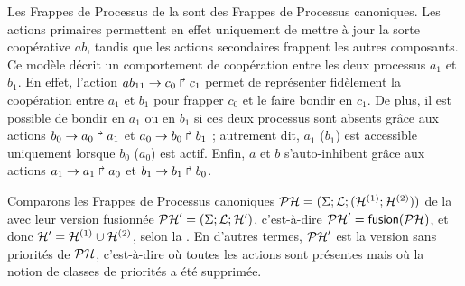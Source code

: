\begin{example}
  Les Frappes de Processus de la 
  sont des Frappes de Processus canoniques.
  Les actions primaires permettent en effet uniquement de mettre à jour la sorte coopérative $ab$,
  tandis que les actions secondaires frappent les autres composants.
  Ce modèle décrit un comportement de coopération entre les deux processus $a_1$ et $b_1$.
  En effet, l'action $ab_{11}\rightarrow c_0\Rsh c_1$
  permet de représenter fidèlement la coopération entre $a_1$ et $b_1$ pour
  frapper $c_0$ et le faire bondir en $c_1$.
  De plus, il est possible de bondir en $a_1$ ou en $b_1$ si ces deux processus sont absents
  grâce aux actions $b_0\rightarrow a_0\Rsh a_1$ et $a_0\rightarrow b_0\Rsh b_1$ ;
  autrement dit, $a_1$ (\resp $b_1$) est accessible uniquement lorsque $b_0$
  (\resp $a_0$) est actif.
  Enfin, $a$ et $b$ s'auto-inhibent grâce aux actions
  $a_1\rightarrow a_1\Rsh a_0$ et $b_1\rightarrow b_1\Rsh b_0$.
  
  Comparons les Frappes de Processus canoniques $\mathcal{PH} = (\Sigma; \mathcal{L}; (\mathcal{H}^{(1)}; \mathcal{H}^{(2)}))$
  de la  avec leur version fusionnée $\mathcal{PH}' = (\Sigma; \mathcal{L}; \mathcal{H}')$,
  c'est-à-dire $\mathcal{PH}' = \mathsf{fusion}(\mathcal{PH})$, et donc $\mathcal{H}' = \mathcal{H}^{(1)} \cup \mathcal{H}^{(2)}$,
  selon la .
  En d'autres termes, $\mathcal{PH}'$ est la version sans priorités de $\mathcal{PH}$,
  c'est-à-dire où toutes les actions sont présentes mais où la notion de classes de priorités
  a été supprimée.
  

\end{example}

